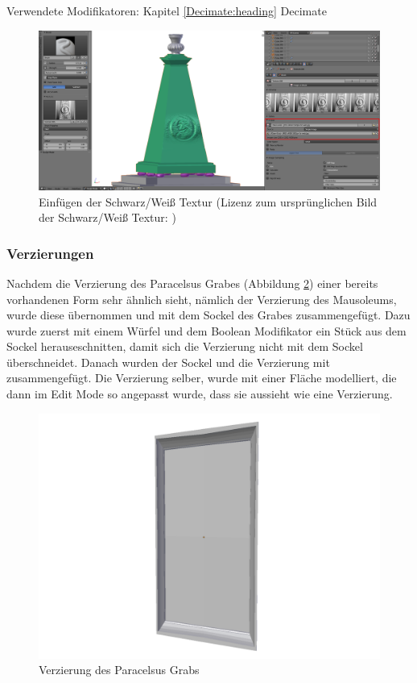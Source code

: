 Verwendete Modifikatoren: Kapitel \ref{Decimate:heading} Decimate
\begin{figure}[H]
    \centering
    \includegraphics[width=.8\textwidth]{images/Paracelsus-Grab_Brush.png}
    \caption{Einfügen der Schwarz/Weiß Textur (Lizenz zum ursprünglichen Bild der Schwarz/Weiß Textur: \citep{paracelsusgrab:bild})}
    \label{Paracelsus_Grab:image4}
\end{figure}

\subsubsection{Verzierungen}
Nachdem die Verzierung des Paracelsus Grabes (Abbildung \ref{Paracelsus_Grab:image3}) einer bereits vorhandenen Form sehr ähnlich sieht, nämlich der Verzierung des Mausoleums, wurde diese übernommen und
mit dem Sockel des Grabes zusammengefügt. Dazu wurde zuerst mit einem Würfel und dem Boolean Modifikator ein Stück aus dem Sockel herauseschnitten, damit
sich die Verzierung nicht mit dem Sockel überschneidet. Danach wurden der Sockel und die Verzierung mit  zusammengefügt. Die Verzierung selber, wurde mit einer
Fläche modelliert, die dann im Edit Mode so angepasst wurde, dass sie aussieht wie eine Verzierung.
\begin{figure}[H]
    \centering
    \includegraphics[width=.8\textwidth]{images/Paracelsus-Grab_Verzierung.png}
    \caption{Verzierung des Paracelsus Grabs}
    \label{Paracelsus_Grab:image3}
\end{figure}

